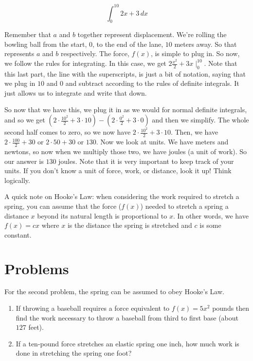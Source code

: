 \documentclass[12pt]{article}
\begin{document}
\begin{equation*}
    \int^{10}_0 2x+3 \, dx
\end{equation*}

Remember that $a$ and $b$ together represent displacement. We're rolling the bowling ball from the start, $0$, to the end of the lane, $10$ meters away. So that represents $a$ and $b$ respectively. The force, $f(x)$, is simple to plug in. So now, we follow the rules for integrating. In this case, we get $2\frac{x^2}{2}+3x\mid^{10}_0$. Note that this last part, the line with the superscripts, is just a bit of notation, saying that we plug in $10$ and $0$ and subtract according to the rules of definite integrals. It just allows us to integrate and write that down. 

So now that we have this, we plug it in as we would for normal definite integrals, and so we get $(2\cdot\frac{10^2}{2}+3\cdot 10) - (2\cdot\frac{0^2}{2}+3\cdot 0)$ and then we simplify. The whole second half comes to zero, so we now have $2\cdot\frac{10^2}{2}+3\cdot 10$. Then, we have $2\cdot \frac{100}{2}+ 30$ or $2\cdot 50 + 30$ or $130$. Now we look at units. We have meters and newtons, so now when we multiply those two, we have joules (a unit of work). So our answer is $130$ joules. Note that it is very important to keep track of your units. If you don't know a unit of force, work, or distance, look it up! Think logically.

A quick note on Hooke's Law: when considering the work required to stretch a spring, you can assume that the force ($f(x)$) needed to stretch a spring a distance $x$ beyond its natural length is proportional to $x$. In other words, we have $f(x) = cx$ where $x$ is the distance the spring is stretched and $c$ is some constant.

\section{Problems}
For the second problem, the spring can be assumed to obey Hooke's Law.

\begin{enumerate}
    \item If throwing a baseball requires a force equivalent to $f(x) = 5x^2$ pounds then find the work necessary to throw a baseball from third to first base (about $127$ feet).
    \item If a ten-pound force stretches an elastic spring one inch, how much work is done in stretching the spring one foot?
\end{enumerate}
\end{document}
